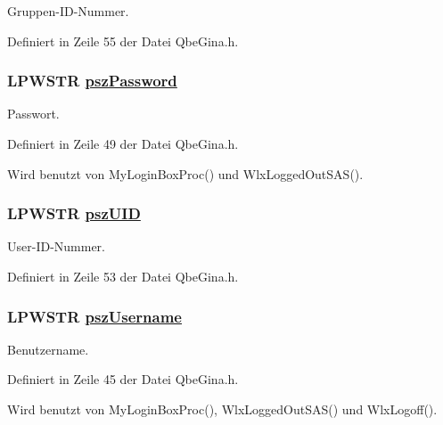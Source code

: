 Gruppen-ID-Nummer. 



Definiert in Zeile 55 der Datei Qbe\-Gina.h.\hypertarget{structQbeGina__AccountInfo_QbeGina__AccountInfoo2}{
\subsubsection[pszPassword]{\setlength{\rightskip}{0pt plus 5cm}LPWSTR \hyperlink{structQbeGina__AccountInfo_QbeGina__AccountInfoo2}{psz\-Password}}}
\label{structQbeGina__AccountInfo_QbeGina__AccountInfoo2}


Passwort. 



Definiert in Zeile 49 der Datei Qbe\-Gina.h.

Wird benutzt von My\-Login\-Box\-Proc() und Wlx\-Logged\-Out\-SAS().\hypertarget{structQbeGina__AccountInfo_QbeGina__AccountInfoo4}{
\subsubsection[pszUID]{\setlength{\rightskip}{0pt plus 5cm}LPWSTR \hyperlink{structQbeGina__AccountInfo_QbeGina__AccountInfoo4}{psz\-UID}}}
\label{structQbeGina__AccountInfo_QbeGina__AccountInfoo4}


User-ID-Nummer. 



Definiert in Zeile 53 der Datei Qbe\-Gina.h.\hypertarget{structQbeGina__AccountInfo_QbeGina__AccountInfoo0}{
\subsubsection[pszUsername]{\setlength{\rightskip}{0pt plus 5cm}LPWSTR \hyperlink{structQbeGina__AccountInfo_QbeGina__AccountInfoo0}{psz\-Username}}}
\label{structQbeGina__AccountInfo_QbeGina__AccountInfoo0}


Benutzername. 



Definiert in Zeile 45 der Datei Qbe\-Gina.h.

Wird benutzt von My\-Login\-Box\-Proc(), Wlx\-Logged\-Out\-SAS() und Wlx\-Logoff().